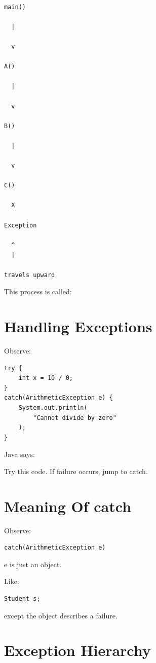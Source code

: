 \documentclass[11pt,a4paper]{book}
\begin{document}
\begin{verbatim}

main()

  |

  v

A()

  |

  v

B()

  |

  v

C()

  X

Exception

  ^
  |

travels upward

\end{verbatim}

This process is called: 
{\ttfamily{\textcolor{RosettaJade}{Stack Unwinding}}}

\section{Handling Exceptions}

Observe:

\begin{verbatim} 
try {
    int x = 10 / 0;
}
catch(ArithmeticException e) {
    System.out.println(
        "Cannot divide by zero"
    );
}
\end{verbatim}

Java says:

Try this code. If failure occurs,
jump to catch.

\section{Meaning Of catch}

Observe:

\begin{verbatim} 
catch(ArithmeticException e)
\end{verbatim}

e is just an object.

Like:
\begin{verbatim} 
Student s;
\end{verbatim}
except the object describes
a failure.

\section{Exception Hierarchy}
\end{document}
